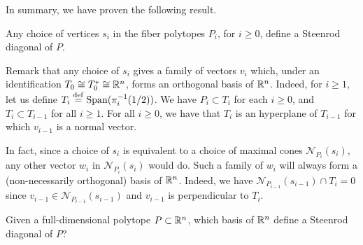 In summary, we have proven the following result.

\begin{theorem}
    Any choice of vertices $s_i$ in the fiber polytopes $P_i$, for $i\geq 0$, define a Steenrod diagonal of $P$. 
\end{theorem}

Remark that any choice of $s_i$ gives a family of vectors $v_i$ which, under an identification $T_0 \cong T_0^{*} \cong \mathbb{R}^n$, forms an orthogonal basis of $\mathbb{R}^n$. Indeed, for $i \geq 1$, let us define $T_i \stackrel{\mathrm{def}}{=} \operatorname{\mathrm{Span}}(\pi_{i}^{-1}(1/2))$. We have $P_i \subset T_i$ for each $i \geq 0$, and $T_i \subset T_{i-1}$ for all $i\geq 1$. For all $i \geq 0$, we have that $T_i$ is an hyperplane of $T_{i-1}$ for which $v_{i-1}$ is a normal vector.  

In fact, since a choice of $s_i$ is equivalent to a choice of maximal cones $\mathcal{N}_{P_i}(s_i)$, any other vector $w_i$ in $\mathcal{N}_{P_i}(s_i)$ would do. Such a family of $w_i$ will always form a (non-necessarily orthogonal) basis of $\mathbb{R}^n$. Indeed, we have $\mathcal{N}_{P_{i-1}}(s_{i-1}) \cap T_{i} = 0$ since $v_{i-1} \in \mathcal{N}_{P_{i-1}}(s_{i-1})$ and $v_{i-1}$ is perpendicular to $T_i$.

\begin{question} 
    Given a full-dimensional polytope $P \subset \mathbb{R}^n$, which basis of $\mathbb{R}^n$ define a Steenrod diagonal of $P$? 
\end{question}

\begin{example}
\end{example}

\begin{example}[Zonotopes]
\end{example}





